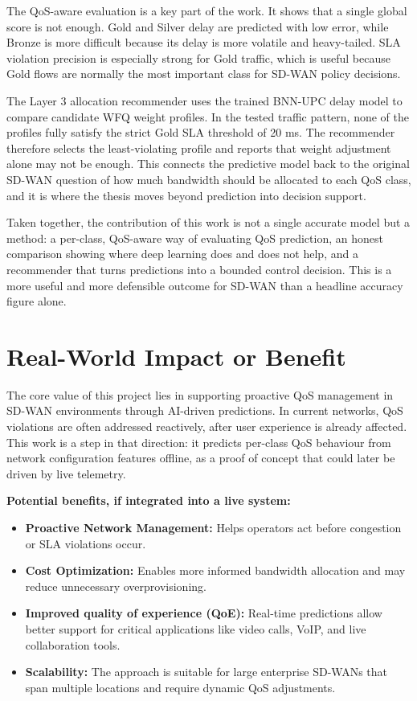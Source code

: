 \documentclass[a4paper,12pt]{Classes/RoboticsLaTeX}
\begin{document}
The QoS-aware evaluation is a key part of the work. It shows that a single global score is not enough. Gold and Silver delay are predicted with low error, while Bronze is more difficult because its delay is more volatile and heavy-tailed. SLA violation precision is especially strong for Gold traffic, which is useful because Gold flows are normally the most important class for SD-WAN policy decisions.

The Layer 3 allocation recommender uses the trained BNN-UPC delay model to compare candidate WFQ weight profiles. In the tested traffic pattern, none of the profiles fully satisfy the strict Gold SLA threshold of 20 ms. The recommender therefore selects the least-violating profile and reports that weight adjustment alone may not be enough. This connects the predictive model back to the original SD-WAN question of how much bandwidth should be allocated to each QoS class, and it is where the thesis moves beyond prediction into decision support.

Taken together, the contribution of this work is not a single accurate model but a method: a per-class, QoS-aware way of evaluating QoS prediction, an honest comparison showing where deep learning does and does not help, and a recommender that turns predictions into a bounded control decision. This is a more useful and more defensible outcome for SD-WAN than a headline accuracy figure alone.

\section{Real-World Impact or Benefit}

The core value of this project lies in supporting proactive QoS management in SD-WAN environments through AI-driven predictions. In current networks, QoS violations are often addressed reactively, after user experience is already affected. This work is a step in that direction: it predicts per-class QoS behaviour from network configuration features offline, as a proof of concept that could later be driven by live telemetry.

\textbf{Potential benefits, if integrated into a live system:}
\begin{itemize}
    \item \textbf{Proactive Network Management:} Helps operators act before congestion or SLA violations occur.
    \item \textbf{Cost Optimization:} Enables more informed bandwidth allocation and may reduce unnecessary overprovisioning.
    \item \textbf{Improved quality of experience (QoE):} Real-time predictions allow better support for critical applications like video calls, VoIP, and live collaboration tools.
    \item \textbf{Scalability:} The approach is suitable for large enterprise SD-WANs that span multiple locations and require dynamic QoS adjustments.
\end{itemize}
\end{document}
